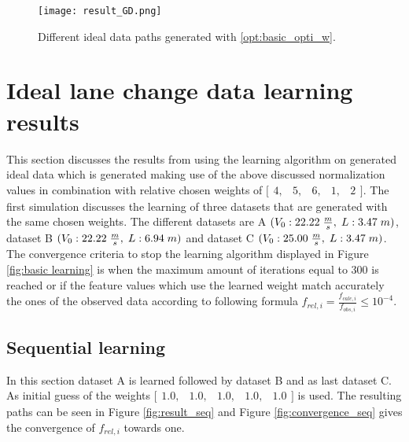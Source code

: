 \begin{figure}[h!]
	\centering
	\texttt{[image: result\_GD.png]}
	\caption{Different ideal data paths generated with \ref{opt:basic_opti_w}.}
	\label{fig:result_GD}
\end{figure}



\section{Ideal lane change data learning results} \label{s:ID_results}
This section discusses the results from using the learning algorithm on generated ideal data which is generated making use of the above discussed normalization values in combination with relative chosen weights of $ \bigl[ \begin{smallmatrix} 4,&5,&6,&1,&2\end{smallmatrix}\bigr]$. The first simulation discusses the learning of three datasets that are generated with the same chosen weights. The different datasets are A $(V_0:22.22\hspace{1mm}\frac{m}{s},\hspace{1mm} L:3.47\hspace{1mm}m)$, dataset B $(V_0:22.22\hspace{1mm}\frac{m}{s},\hspace{1mm} L:6.94\hspace{1mm}m)$ and dataset C $(V_0:25.00\hspace{1mm}\frac{m}{s},\hspace{1mm} L:3.47\hspace{1mm}m)$. The convergence criteria to stop the learning algorithm displayed in Figure \ref{fig:basic learning} is when the maximum amount of iterations equal to $300$ is reached or if the feature values which use the learned weight match accurately the ones of the observed data according to following formula $f_{rel,i} = \frac{f_{calc,i}}{f_{obs,i}} \leq 10^{-4}$.

\subsection{Sequential learning}
In this section dataset A is learned followed by dataset B and as last dataset C.
As initial guess of the weights $\bigl[ \begin{smallmatrix} 1.0,&1.0,&1.0,&1.0,&1.0\end{smallmatrix}\bigr]$ is used.  The resulting paths can be seen in Figure \ref{fig:result_seq} and Figure \ref{fig:convergence_seq} gives the convergence of $f_{rel,i}$ towards one.\\

